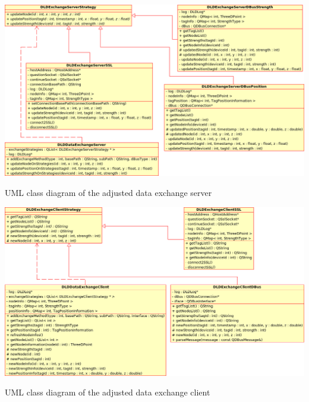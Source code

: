     \begin{staticFigure}
     \includegraphics[scale=0.36]{UMLDiagrams/dldDataExchangeServerNew.png}
     \caption{UML class diagram of the adjusted data exchange server}
     \label{fg:implementation:newDataExchangeServer}
    \end{staticFigure}
    \begin{staticFigure}
     \includegraphics[scale=0.36]{UMLDiagrams/dldDataExchangeClientNew.png}
     \caption{UML class diagram of the adjusted data exchange client}
     \label{fg:implementation:newDataExchangeClient}
    \end{staticFigure}

